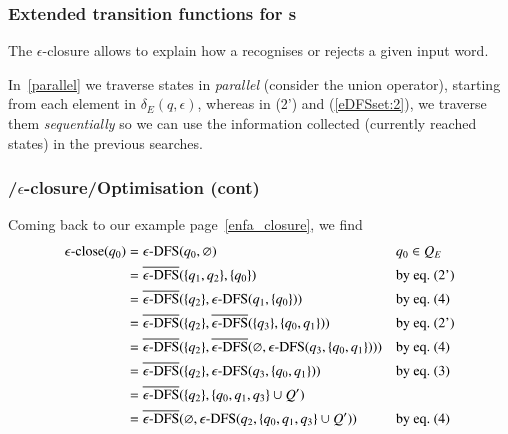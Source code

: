 %
\begin{frame}
\frametitle{Extended transition functions for {\eNFA}s}

The \(\epsilon\)-closure allows to explain how a \eNFA recognises or
rejects a given input word.

\bigskip

In~\eqref{parallel} we traverse states in \emph{parallel} (consider
the union operator), starting from each element in \(\delta_E (q,
\epsilon)\), whereas in (2') and (\ref{eDFSset:2}), we traverse them
\emph{sequentially} so we can use the information collected (currently
reached states) in the previous searches.

\end{frame}

%
\begin{frame}
\frametitle{\eNFA{}/\(\epsilon\)-closure/Optimisation (cont)}

Coming back to our example page~\ref{enfa_closure}, we find
\begin{align*}
   \epsilon\text{-close} (q_0)
&= \epsilon\text{-DFS} (q_0, \varnothing)
&& q_0 \in Q_E\\
&= \overline{\epsilon\text{-DFS}} (\{q_1, q_2\}, \{q_0\})
&& \text{by eq.~(2')}\\
&= \overline{\epsilon\text{-DFS}} (\{q_2\}, \epsilon\text{-DFS} (q_1, \{q_0\}))
&& \text{by eq.~(4)}\\
&= \overline{\epsilon\text{-DFS}} (\{q_2\}, \overline{\epsilon\text{-DFS}} (\{q_3\}, \{q_0,
   q_1\}))
&& \text{by eq.~(2')}\\
&= \overline{\epsilon\text{-DFS}} (\{q_2\}, \overline{\epsilon\text{-DFS}} (\varnothing, \epsilon\text{-DFS} (q_3, \{q_0, q_1\})))
&& \text{by eq.~(4)}\\
&= \overline{\epsilon\text{-DFS}} (\{q_2\}, \epsilon\text{-DFS} (q_3, \{q_0, q_1\}))
&& \text{by eq.~(3)}\\
&= \overline{\epsilon\text{-DFS}} (\{q_2\}, \{q_0, q_1, q_3\} \cup Q')\\
&= \overline{\epsilon\text{-DFS}} (\varnothing, \epsilon\text{-DFS} (q_2, \{q_0, q_1, q_3\} \cup Q'))
&& \text{by eq.~(4)}
\end{align*}

\end{frame}

